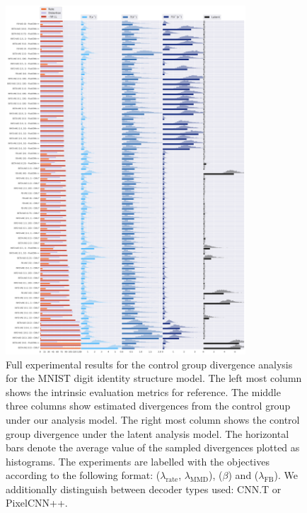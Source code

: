 \begin{figure}[!htb]
    \centering
    \includegraphics[width=0.8\textwidth]{images/kl_plots/mnist_selection_False.png}
    \caption{Full experimental results for the control group divergence analysis for the MNIST digit identity structure model. The left most column shows the intrinsic evaluation metrics for reference. The middle three columns show estimated divergences from the control group under our analysis model. The right most column shows the control group divergence under the latent analysis model. The horizontal bars denote the average value of the sampled divergences plotted as histograms. The experiments are labelled with the objectives according to the following format: \infovae ($\lambda_{\text{rate}}$, $\lambda_{\text{MMD}}$), \betavae ($\beta$) and \fbvae ($\lambda_{\text{FB}}$). We additionally distinguish between decoder types used: CNN.T or PixelCNN++.}
    \label{fig:kl-plot-mnist}
\end{figure}

